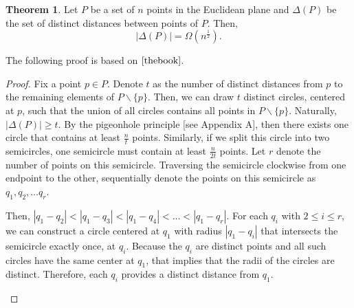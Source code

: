 \documentclass{scrippsthesisclass}
\theoremstyle{definition}
\newtheorem{theorem}{Theorem}[section]
\begin{document}
\begin{theorem} \cite{Erdos46}
Let $P$ be a set of $n$ points in the Euclidean plane and $\Delta(P)$ be the set of distinct distances between points of $P$. Then,
\[
|\Delta(P)| = \Omega \left(n^{\frac{1}{2}}\right).
\]
\end{theorem}
The following proof is based on $\cite{thebook}$.
\begin{proof}
    Fix a point $p \in P$. 
    Denote $t$ as the number of distinct distances from $p$ to the remaining elements of $P\backslash \{p\}$. 
    Then, we can draw $t$ distinct circles, centered at $p$, such that the union of all circles contains all points in $P\backslash \{p\}$. 
    Naturally, $|\Delta(P)| \geq t$.
    By the pigeonhole principle [see Appendix A], then there exists one circle that contains at least $\frac{n}{t}$ points. 
    Similarly, if we split this circle into two semicircles, one semicircle must contain at least $\frac{n}{2t}$ points. 
    Let $r$ denote the number of points on this semicircle. 
    Traversing the semicircle clockwise from one endpoint to the other, sequentially denote the points on this semicircle as $q_1, q_2, \dots q_r$.
    
    Then, $|q_1 - q_2| < |q_1 - q_3| < |q_1 - q_4| < \dots < |q_1 - q_r|$.
    For each $q_i$ with $2 \leq i \leq r$, we can construct a circle centered at $q_1$ with radius $|q_1 - q_i|$ that intersects the semicircle exactly once, at $q_i$.
    Because the $q_i$ are distinct points and all such circles have the same center at $q_1$, that implies that the radii of the circles are distinct. 
    Therefore, each $q_i$ provides a distinct distance from $q_1$. 

\begin{center}
\end{center}
    

\end{proof}
\end{document}
